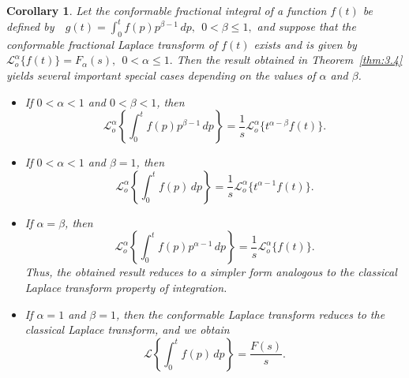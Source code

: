 \documentclass[two side,reqno,12pt]{amsart}
\numberwithin{equation}{section}
\newtheorem{corollary}[lemma]{Corollary}
\theoremstyle{definition}
\begin{document}
\begin{corollary}

Let the conformable fractional integral of a function $f(t)$ be defined by\ \
$
g(t)=\int_{0}^{t} f(p)p^{\beta-1}\,dp, \ \ 0<\beta\le1,
$
and suppose that the conformable fractional Laplace transform of $f(t)$ exists and is given by\ \
$
\mathcal{L}_{o}^{\alpha}\{f(t)\}=F_{\alpha}(s), \ \ 0<\alpha\le1.
$
Then the result obtained in Theorem~\ref{thm:3.4} yields several important special cases depending on the values of $\alpha$ and $\beta$.
\begin{itemize}
\item[(i)] If $0<\alpha<1$ and $0<\beta<1$, then
\[
\mathcal{L}_{o}^{\alpha}\left\{\int_{0}^{t} f(p)p^{\beta-1}\,dp\right\}
=\frac{1}{s}\mathcal{L}_{o}^{\alpha}\{t^{\alpha-\beta}f(t)\}.
\]
\item[(ii)] If $0<\alpha<1$ and $\beta=1$, then
\[
\mathcal{L}_{o}^{\alpha}\left\{\int_{0}^{t} f(p)\,dp\right\}
=
\frac{1}{s}\mathcal{L}_{o}^{\alpha}\{t^{\alpha-1}f(t)\}.
\]
\item[(iii)] If $\alpha=\beta$, then
\[
\mathcal{L}_{o}^{\alpha}\left\{\int_{0}^{t} f(p)p^{\alpha-1}\,dp\right\}
=
\frac{1}{s}\mathcal{L}_{o}^{\alpha}\{f(t)\}.
\]
Thus, the obtained result reduces to a simpler form analogous to the classical Laplace transform property of integration.
\item[(iv)] If $\alpha=1$ and $\beta=1$, then the conformable Laplace transform reduces to the classical Laplace transform, and we obtain
\[
\mathcal{L}\left\{\int_{0}^{t} f(p)\,dp\right\}
=\frac{F(s)}{s}.
\]
\end{itemize}
\end{corollary}
\end{document}
